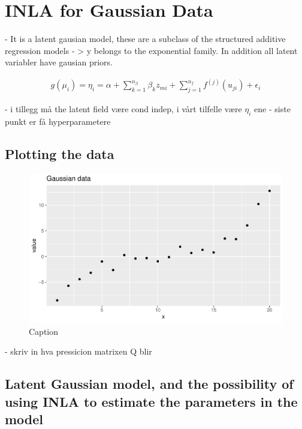 \section{INLA for Gaussian Data}

- It is a latent gausian model, these are a subclass of the structured additive regression models - > y belongs to the exponential family. In addition all latent variabler have gausian priors. 

\begin{equation}
\begin{split}
    g(\mu_i) = \eta_i = \alpha + \sum_{k = 1}^{n_\beta} \beta_k z_{mi} + \sum_{j = 1}^{n_f}f^{(j)}(u_{ji}) + \epsilon_i
\end{split}
\end{equation}

- i tillegg må the latent field være cond indep, i vårt tilfelle være $\eta_i$ ene
- siste punkt er få hyperparametere

\subsection{Plotting the data}
 
\begin{figure}
    \centering
    \includegraphics[width=\textwidth]{Images/gaussian_data.pdf}
    \caption{Caption}
    \label{fig:gaussian_data}
\end{figure}

- skriv in hva pressicion matrixen Q blir

\subsection{Latent Gaussian model, and the possibility of using INLA to estimate the parameters in the model}

